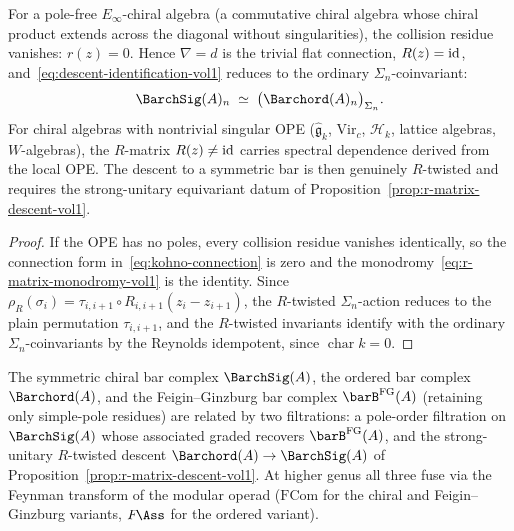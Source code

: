 \begin{corollary}
\ClaimStatusProvedHere
\label{cor:pole-free-descent}
For a pole-free $E_\infty$-chiral algebra \textup{(}a commutative chiral
algebra whose chiral product extends across the diagonal without
singularities\textup{)}, the collision residue vanishes:
$r(z)=0$. Hence $\nabla=d$ is the trivial flat connection,
$R(z)=\mathrm{id}$, and~\eqref{eq:descent-identification-vol1} reduces to
the ordinary $\Sigma_n$-coinvariant:
\[
\BarchSig(A)_n
\;\simeq\;
\bigl(\Barchord(A)_n\bigr)_{\Sigma_n}.
\]
For chiral algebras with nontrivial singular OPE
\textup{(}$\widehat{\mathfrak{g}}_k$, $\mathrm{Vir}_c$,
$\mathcal{H}_k$, lattice algebras, $W$-algebras\textup{)}, the
$R$-matrix $R(z)\neq\mathrm{id}$ carries spectral dependence derived from the
local OPE. The descent to a symmetric bar is then genuinely
$R$-twisted and requires the strong-unitary equivariant datum of
Proposition~\ref{prop:r-matrix-descent-vol1}.
\end{corollary}

\begin{proof}
If the OPE has no poles, every collision residue vanishes identically,
so the connection form in~\eqref{eq:kohno-connection} is zero and the
monodromy~\eqref{eq:r-matrix-monodromy-vol1} is the identity.
Since
\(\rho_R(\sigma_i)=\tau_{i,i+1}\circ R_{i,i+1}(z_i-z_{i+1})\),
the $R$-twisted $\Sigma_n$-action reduces to the plain permutation
$\tau_{i,i+1}$, and the
$R$-twisted invariants identify with the ordinary
$\Sigma_n$-coinvariants by the Reynolds idempotent, since
\(\operatorname{char} k=0\).
\end{proof}

\begin{remark}
\label{rem:three-bar-variants}%
%
The symmetric chiral bar complex $\BarchSig(A)$, the ordered bar
complex $\Barchord(A)$, and the
Feigin--Ginzburg bar complex $\barB^{\mathrm{FG}}(A)$
(retaining only simple-pole residues) are related by two
filtrations: a pole-order filtration on $\BarchSig(A)$
whose associated graded recovers $\barB^{\mathrm{FG}}(A)$,
and the strong-unitary $R$-twisted descent
$\Barchord(A) \to \BarchSig(A)$ of
Proposition~\ref{prop:r-matrix-descent-vol1}.
At higher genus all three fuse via the Feynman transform
of the modular operad ($\mathrm{FCom}$ for the chiral and
Feigin--Ginzburg variants, $F\!\Ass$ for the ordered variant).
\end{remark}

